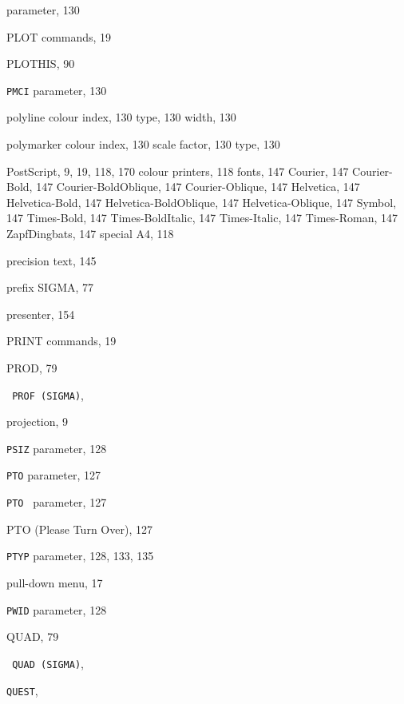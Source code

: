 \begin{theindex}
     parameter, 130
  \item PLOT
    \subitem commands, 19
  \item {\ttfamily  PLOTHIS}, 90
  \item {\tt PMCI}
     parameter, 130
  \item polyline
    \subitem colour index, 130
    \subitem type, 130
    \subitem width, 130
  \item polymarker
    \subitem colour index, 130
    \subitem scale factor, 130
    \subitem type, 130
  \item PostScript, 9, 19, 118, 170
    \subitem colour printers, 118
    \subitem fonts, 147
      \subsubitem Courier, 147
      \subsubitem Courier-Bold, 147
      \subsubitem Courier-BoldOblique, 147
      \subsubitem Courier-Oblique, 147
      \subsubitem Helvetica, 147
      \subsubitem Helvetica-Bold, 147
      \subsubitem Helvetica-BoldOblique, 147
      \subsubitem Helvetica-Oblique, 147
      \subsubitem Symbol, 147
      \subsubitem Times-Bold, 147
      \subsubitem Times-BoldItalic, 147
      \subsubitem Times-Italic, 147
      \subsubitem Times-Roman, 147
      \subsubitem ZapfDingbats, 147
    \subitem special A4, 118
  \item precision
    \subitem text, 145
  \item prefix SIGMA, 77
  \item presenter, 154
  \item PRINT
    \subitem commands, 19
  \item {\ttfamily  PROD}, 79
  \item \texttt  { PROF \textrm  {(SIGMA)}}, 
  \item projection, 9
  \item {\tt PSIZ}
     parameter, 128
  \item {\tt PTO}
     parameter, 127
  \item {\tt PTO }
     parameter, 127
  \item PTO (Please Turn Over), 127
  \item {\tt PTYP}
     parameter, 128, 133, 135
  \item pull-down menu, 17
  \item {\tt PWID}
     parameter, 128

  \indexspace

  \item {\ttfamily  QUAD}, 79
  \item \texttt  { QUAD \textrm  {(SIGMA)}}, 
  \item \texttt{QUEST}, 


\end{theindex}
